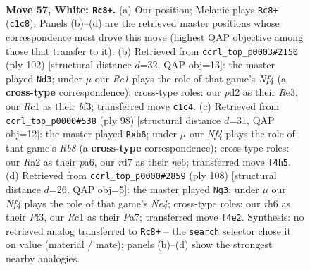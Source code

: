 \documentclass[11pt]{article}
\begin{document}
\clearpage

\begin{figure}[p]\centering
\begin{subfigure}{0.46\textwidth}\centering
\resizebox{\linewidth}{!}{%
\newchessgame
\chessboard[
  setfen={5k2/3r1p2/7r/p7/4KN2/1P6/R2p3P/2R5 w - - 0 57},
  showmover=false,
  pgfstyle=straightmove, color=movearrow, markmove={c1-c8}
]}
\caption{}
\end{subfigure}\hfill
\begin{subfigure}{0.46\textwidth}\centering
\resizebox{\linewidth}{!}{%
\newchessgame
\chessboard[
  setfen={8/5k1p/8/1P4p1/5N2/2K1RbP1/4p2r/8 w - - 0 52},
  showmover=false,
  pgfstyle=straightmove, color=movearrow, markmove={f4-d3}
]}
\caption{}
\end{subfigure}
\\[4pt]
\begin{subfigure}{0.46\textwidth}\centering
\resizebox{\linewidth}{!}{%
\newchessgame
\chessboard[
  setfen={1R6/5N1k/pp2nr1p/8/P7/4K3/1P6/8 w - - 0 50},
  showmover=false,
  pgfstyle=straightmove, color=movearrow, markmove={b8-b6}
]}
\caption{}
\end{subfigure}\hfill
\begin{subfigure}{0.46\textwidth}\centering
\resizebox{\linewidth}{!}{%
\newchessgame
\chessboard[
  setfen={8/P1n2pk1/2p5/7R/1P1KN3/5P2/2r4p/8 w - - 17 55},
  showmover=false,
  pgfstyle=straightmove, color=movearrow, markmove={e4-g3}
]}
\caption{}
\end{subfigure}
\caption{\textbf{Move 57, White: \texttt{Rc8+}.} (a) Our position; Melanie plays \texttt{Rc8+} (\texttt{c1c8}). Panels (b)--(d) are the retrieved master positions whose correspondence most drove this move (highest QAP objective among those that transfer to it). (b) Retrieved from \texttt{ccrl\_top\_p0003\#2150} (ply 102) [structural distance $d$=32, QAP obj=13]: the master played \texttt{Nd3}; under $\mu$ our \emph{Rc1} plays the role of that game's \emph{Nf4} (a \textbf{cross-type} correspondence); cross-type roles: our \emph{p}d2 as their \emph{R}e3, our \emph{R}c1 as their \emph{b}f3; transferred move \texttt{c1c4}. (c) Retrieved from \texttt{ccrl\_top\_p0000\#538} (ply 98) [structural distance $d$=31, QAP obj=12]: the master played \texttt{Rxb6}; under $\mu$ our \emph{Nf4} plays the role of that game's \emph{Rb8} (a \textbf{cross-type} correspondence); cross-type roles: our \emph{R}a2 as their \emph{p}a6, our \emph{r}d7 as their \emph{n}e6; transferred move \texttt{f4h5}. (d) Retrieved from \texttt{ccrl\_top\_p0000\#2859} (ply 108) [structural distance $d$=26, QAP obj=5]: the master played \texttt{Ng3}; under $\mu$ our \emph{Nf4} plays the role of that game's \emph{Ne4}; cross-type roles: our \emph{r}h6 as their \emph{P}f3, our \emph{R}c1 as their \emph{P}a7; transferred move \texttt{f4e2}. Synthesis: no retrieved analog transferred to \texttt{Rc8+} -- the \texttt{search} selector chose it on value (material / mate); panels (b)--(d) show the strongest nearby analogies.}
\label{fig:thought-m112}
\end{figure}
\end{document}
